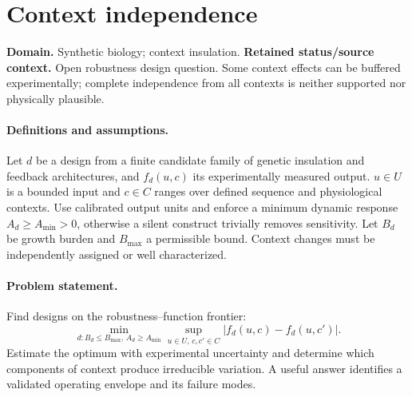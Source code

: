 \documentclass[11pt]{article}
\begin{document}
\section*{Context independence}
\label{prob:262}
\label{rank:109}
\par\smallskip

\noindent\textbf{Domain.} Synthetic biology; context insulation. \quad \textbf{Retained status/source context.} Open robustness design question. Some context effects can be buffered experimentally; complete independence from all contexts is neither supported nor physically plausible.

\paragraph{Definitions and assumptions.} Let $d$ be a design from a finite candidate family of genetic insulation and feedback architectures, and $f_d(u,c)$ its experimentally measured output. $u\in U$ is a bounded input and $c\in C$ ranges over defined sequence and physiological contexts. Use calibrated output units and enforce a minimum dynamic response $A_d\geq A_{\min}>0$, otherwise a silent construct trivially removes sensitivity. Let $B_d$ be growth burden and $B_{\max}$ a permissible bound. Context changes must be independently assigned or well characterized.

\paragraph{Problem statement.} Find designs on the robustness--function frontier:
\[
\min_{d:B_d\leq B_{\max},\,A_d\geq A_{\min}}
\sup_{u\in U,\,c,c'\in C}|f_d(u,c)-f_d(u,c')|.
\]
Estimate the optimum with experimental uncertainty and determine which components of context produce irreducible variation. A useful answer identifies a validated operating envelope and its failure modes.
\end{document}
